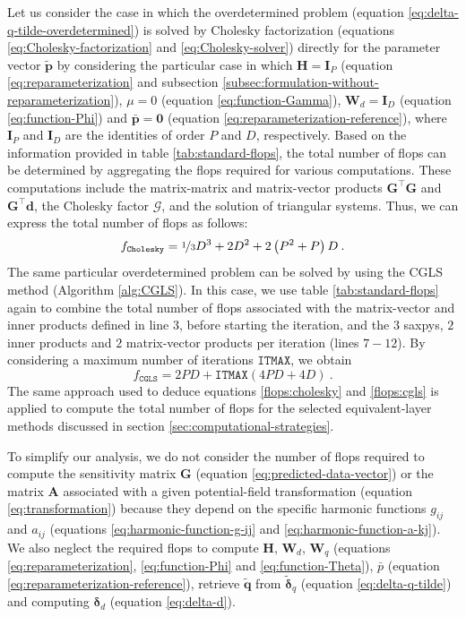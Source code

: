 \documentclass[utf8]{FrontiersinHarvard} %
\begin{document}
	Let us consider the case in which the overdetermined problem
	(equation \ref{eq:delta-q-tilde-overdetermined}) is solved by Cholesky factorization (equations \ref{eq:Cholesky-factorization} and \ref{eq:Cholesky-solver})
	directly for the parameter vector $\tilde{\mathbf{p}}$ by considering 
	the particular case in which $\mathbf{H} = \mathbf{I}_{P}$ (equation \ref{eq:reparameterization} and 
	subsection \ref{subsec:formulation-without-reparameterization}),
	$\mu = 0$ (equation \ref{eq:function-Gamma}), 
	$\mathbf{W}_{d} = \mathbf{I}_{D}$ (equation \ref{eq:function-Phi}) and
	$\bar{\mathbf{p}} = \mathbf{0}$ (equation \ref{eq:reparameterization-reference}), 
	where $\mathbf{I}_{P}$ and $\mathbf{I}_{D}$ are the identities of order $P$ and $D$, respectively.
	Based on the information provided in table \ref{tab:standard-flops}, the total number of flops can be determined by aggregating the flops required for various computations. These computations include the matrix-matrix and matrix-vector products $\mathbf{G}^{\top}\mathbf{G}$ and $\mathbf{G}^{\top}\mathbf{d}$, 
	the Cholesky factor $\boldsymbol{\mathcal{G}}$, and the solution of triangular systems. Thus, we can express the total number of flops as follows:
	\begin{equation}
		f_{\mathtt{Cholesky}} = \nicefrac{1}{3}D^{3} + 2 D^{2} + 2 \left( P^{2} + P \right) D \: .
		\label{flops:cholesky}
	\end{equation}
	The same particular overdetermined problem can be solved by using the CGLS method (Algorithm \ref{alg:CGLS}).
	In this case, we use table \ref{tab:standard-flops} again to combine the total number of
	flops associated with the matrix-vector and inner products defined in line 3, before 
	starting the iteration, and the $3$ saxpys, $2$ inner products and $2$ matrix-vector products
	per iteration (lines $7-12$). By considering a maximum number of iterations $\mathtt{ITMAX}$, we obtain
	\begin{equation}
		f_{\mathtt{CGLS}} = 2PD + \mathtt{ITMAX} \left( 4PD + 4D \right) \: .
		\label{flops:cgls}
	\end{equation}
	The same approach used to deduce equations \ref{flops:cholesky} and \ref{flops:cgls} is
	applied to compute the total number of flops for the selected equivalent-layer 
	methods discussed in section \ref{sec:computational-strategies}.
	
	To simplify our analysis, we do not consider the number of flops required to compute the sensitivity matrix 
	$\mathbf{G}$ (equation \ref{eq:predicted-data-vector}) or the matrix $\mathbf{A}$ associated with a given
	potential-field transformation (equation \ref{eq:transformation})
	because they depend on the specific harmonic functions $g_{ij}$ and $a_{ij}$
	(equations \ref{eq:harmonic-function-g-ij} and \ref{eq:harmonic-function-a-kj}).
	We also neglect the required flops to compute $\mathbf{H}$, $\mathbf{W}_{d}$, $\mathbf{W}_{q}$ 
	(equations \ref{eq:reparameterization}, \ref{eq:function-Phi} and \ref{eq:function-Theta}), 
	$\bar{p}$ (equation \ref{eq:reparameterization-reference}), 
	retrieve $\tilde{\mathbf{q}}$ from $\tilde{\boldsymbol{\delta}}_{q}$ (equation \ref{eq:delta-q-tilde}) and computing
	$\boldsymbol{\delta}_{d}$ (equation \ref{eq:delta-d}).
	
\end{document}
